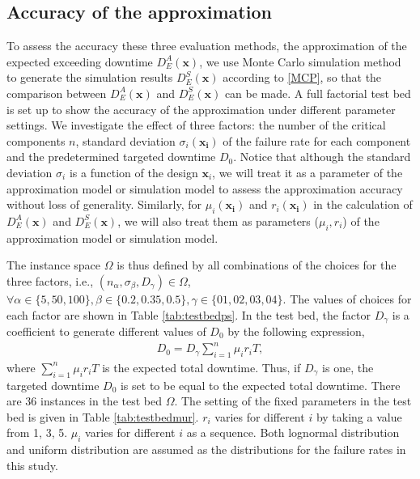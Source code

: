 \documentclass[preprint,12pt]{elsarticle}
\begin{document}
\subsection{Accuracy of the approximation}
To assess the accuracy these three evaluation methods,
 the approximation of the expected exceeding downtime $D_{E}^{A}(\boldsymbol{x})$, we use Monte Carlo simulation method to generate the simulation results $D_{E}^{S}(\boldsymbol{x})$ according to \ref{MCP}, so that the comparison between $D_{E}^{A}(\boldsymbol{x})$ and $D_{E}^{S}(\boldsymbol{x})$ can be made. A full factorial test bed is set up to show the accuracy of the approximation under different parameter settings. We investigate the effect of three factors: the number of the critical components $n$, standard deviation $\sigma_{i}(\boldsymbol{x_i})$ of the failure rate for each component and the predetermined targeted downtime $D_{0}$. Notice that although the standard deviation $\sigma_i$ is a function of the design $\boldsymbol{x}_i$, we will treat it as a parameter of the approximation model or simulation model to assess the approximation accuracy without loss of generality. Similarly, for $\mu_i(\boldsymbol{x_i})$ and $r_i(\boldsymbol{x_i})$ in the calculation of $D_{E}^{A}(\boldsymbol{x})$ and $D_{E}^{S}(\boldsymbol{x})$, we will also treat them as parameters ($\mu_i , r_i$) of the approximation model or simulation model.

The instance space $\Omega$ is thus defined by all combinations of the choices for the three factors, i.e., $(n_{\alpha},\sigma_{\beta},D_{\gamma}) \in \Omega$, $\forall \alpha \in \{5,50,100\}, \beta \in \{0.2,0.35,0.5\}, \gamma \in \{01,02,03,04\}$. The values of choices for each factor are shown in Table \ref{tab:testbedps}. In the test bed, the factor $D_{\gamma}$ is a coefficient to generate different values of $D_0$ by the following expression,
 \begin{eqnarray}
 D_{0} = D_{\gamma}\sum_{i=1}^{n}{\mu_{i} r_{i} T}, \label{D0}
\end{eqnarray}
where $\sum_{i=1}^{n}{\mu_{i} r_{i} T}$ is the expected total downtime. Thus, if $D_{\gamma}$ is one, the targeted downtime $D_0$ is set to be equal to the expected total downtime.
There are 36 instances in the test bed $\Omega$. The setting of the fixed parameters in the test bed is given in Table \ref{tab:testbedmur}. $r_{i}$ varies for different $i$ by taking a value from {1, 3, 5}. $\mu_{i}$ varies for different $i$ as a sequence. Both lognormal distribution and uniform distribution are assumed as the distributions for the failure rates in this study.
\end{document}
